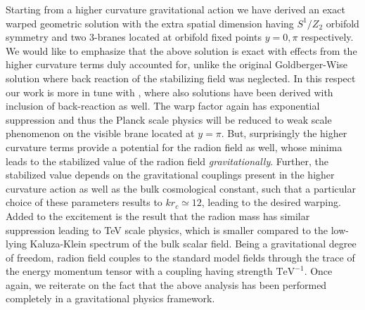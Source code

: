 \documentclass{article}
\begin{document}
Starting from a higher curvature gravitational action we have derived an exact warped geometric solution with the extra spatial dimension having $S^{1}/Z_{2}$ orbifold symmetry and two 3-branes located at orbifold fixed points $y=0,\pi$ respectively. We would like to emphasize that the above solution is exact with effects from the higher curvature terms duly accounted for, unlike the original Goldberger-Wise solution where back reaction of the stabilizing field was neglected. In this respect our work is more in tune with \cite{DeWolfe:1999cp}, where also solutions have been derived with inclusion of back-reaction as well. The warp factor again has exponential suppression and thus the Planck scale physics will be reduced to weak scale phenomenon on the visible brane located at $y=\pi$. But, surprisingly the higher curvature terms provide a potential for the radion field as well, whose minima leads to the stabilized value of the radion field \emph{gravitationally}. Further, the stabilized value depends on the 
gravitational 
couplings present in the higher curvature action as well as the bulk cosmological constant, such that a particular choice of these parameters results to $kr_{c}\simeq 12$, leading to the desired warping. Added to the excitement is the result that the radion mass has similar suppression leading to TeV scale physics, which is smaller compared to the low-lying Kaluza-Klein spectrum of the bulk scalar field. Being a gravitational degree of freedom, radion field couples to the standard model fields through the trace of the energy momentum tensor with a coupling having strength $\textrm{TeV}^{-1}$. Once again, we reiterate on the fact that the above analysis has been performed completely in a gravitational physics framework.
\end{document}
